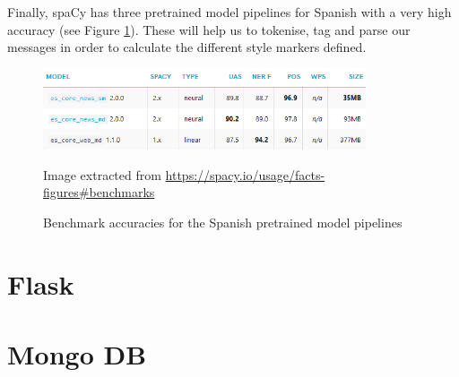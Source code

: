 Finally, spaCy has three pretrained model pipelines for Spanish with a very high accuracy (see Figure \ref{fig:spacymodel}). These will help us to tokenise, tag and parse our messages in order to calculate the different style markers defined.

\begin{figure}[h]
	\centering%
	\includegraphics[width = 0.85\textwidth]{Imagenes/Bitmap/spacymodel.png}%
	\caption{Benchmark accuracies for the Spanish pretrained model pipelines}%
	Image extracted from \url{https://spacy.io/usage/facts-figures#benchmarks}
	\label{fig:spacymodel}
\end{figure}

\section{Flask}\label{sect:flask}

\section{Mongo DB}\label{sect:mongo}